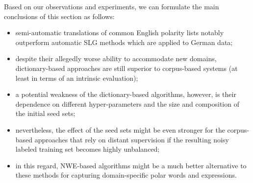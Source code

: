 Based on our observations and experiments, we can formulate the main
conclusions of this section as follows:
\begin{itemize}
\item semi-automatic translations of common English polarity lists
  notably outperform automatic SLG methods which are applied to German
  data;
\item despite their allegedly worse ability to accommodate new
  domains, dictionary-based approaches are still superior to
  corpus-based systems (at least in terms of an intrinsic evaluation);
\item a potential weakness of the dictionary-based algorithms,
  however, is their dependence on different hyper-parameters and the
  size and composition of the initial seed sets;
\item nevertheless, the effect of the seed sets might be even stronger
  for the corpus-based approaches that rely on distant supervision if
  the resulting noisy labeled training set becomes highly unbalanced;
\item in this regard, NWE-based algorithms might be a much better
  alternative to these methods for capturing domain-specific polar
  words and expressions.
\end{itemize}

\newpage
